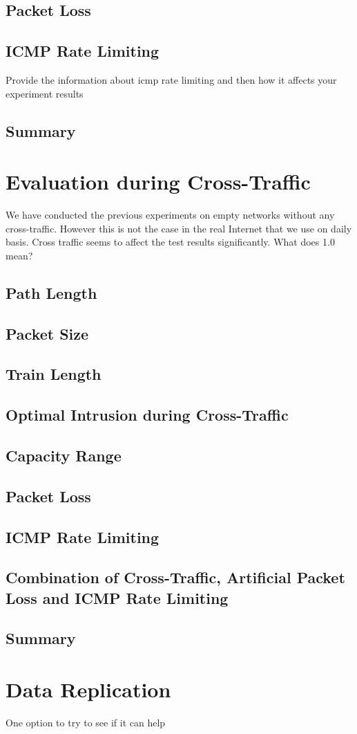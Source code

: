 \subsection{Packet Loss}

\subsection{ICMP Rate Limiting}
Provide the information about icmp rate limiting and then how it affects your experiment results

\subsection{Summary}


\section{Evaluation during Cross-Traffic}
We have conducted the previous experiments on empty networks without any cross-traffic. However this is not the case in the real Internet that we use on daily basis. 
Cross traffic seems to affect the test results significantly. 
What does 1.0 mean?

\subsection{Path Length}

\subsection{Packet Size}

\subsection{Train Length}

\subsection{Optimal Intrusion during Cross-Traffic}

\subsection{Capacity Range}

\subsection{Packet Loss}

\subsection{ICMP Rate Limiting}

\subsection{Combination of Cross-Traffic, Artificial Packet Loss and ICMP Rate Limiting}

\subsection{Summary}


\section{Data Replication}
One option to try to see if it can help
